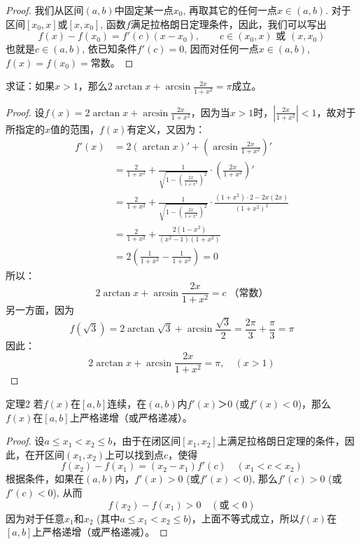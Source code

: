 \begin{proof}
  我们从区间$(a,b)$中固定某一点$x_0$, 再取其它的任何一点$x\in (a,b)$. 对于区间$[x_0,x]$或$[x,x_0]$, 函数$f$满足拉格朗日定理条件，因此，我们可以写出
  \[f (x) -f (x_0) =f' (c) (x-x_0),\qquad c\in (x_0,x)\text{ 或 }(x,x_0)\]
  也就是$c\in (a,b)$, 依已知条件$f'(c)=0$, 因而对任何一点$x\in (a,b)$, $f(x)=f(x_0)=$常数。  
\end{proof}



\begin{example}
    求证：如果$x>1$，那么$2\arctan x+\arcsin\frac{2x}{1+x^2}=\pi$成立。
\end{example}

\begin{proof}
设$f(x)=2\arctan x+\arcsin\frac{2x}{1+x^2}$，因为当$x>1$时，$\left|\frac{2x}{1+x^2}\right|<1$，故对于所指定的$x$值的范围，$f(x)$有定义，又因为：
\[\begin{split}
    f'(x)&=2(\arctan x)'+\left(\arcsin\frac{2x}{1+x^2}\right)'\\
    &=\frac{2}{1+x^2}+\frac{1}{\sqrt{1-\left(\frac{2x}{1+x^2}\right)^2}}\cdot \left(\frac{2x}{1+x^2}\right)'\\
    &=\frac{2}{1+x^2}+\frac{1}{\sqrt{1-\left(\frac{2x}{1+x^2}\right)^2}}\cdot \frac{(1+x^2)\cdot 2-2x(2x)}{(1+x^2)^2}\\
    &=\frac{2}{1+x^2}+\frac{2(1-x^2)}{(x^2-1)(1+x^2)}\\
    &=2\left(\frac{1}{1+x^2}-\frac{1}{1+x^2}\right)=0
\end{split}\]
所以：
\[2\arctan x+\arcsin\frac{2x}{1+x^2}=c\; \text{（常数）}\]
另一方面，因为
\[f\left(\sqrt{3}\right)=2\arctan\sqrt{3}+\arcsin\frac{\sqrt{3}}{2}=\frac{2\pi}{3}+\frac{\pi}{3}=\pi\]
因此：
\[2\arctan x+\arcsin\frac{2x}{1+x^2}=\pi,\quad (x>1)\]
\end{proof}


\begin{blk}
    {定理2} 若$f(x)$在$[a,b]$连续，在$(a,b)$内$f'(x)＞0$ (或$f'(x)<0$)，那么$f(x)$在$[a,b]$上严格递增（或严格递减）。
\end{blk}


\begin{proof}
    设$a\le x_1<x_2\le b$，由于在闭区间$[x_1,x_2]$上满足拉格朗日定理的条件，因此，在开区间$(x_1,x_2)$上可以找到点$c$，使得
\[f(x_2)-f(x_1)=(x_2-x_1)f'(c)\quad (x_1<c<x_2)\]
根据条件，如果在$(a,b)$内，$f'(x)>0$ (或$f'(x)<0$), 那么$f'(c)>0$ (或$f'(c)<0$), 从而
\[f(x_2)-f(x_1)>0\quad (\text{或}<0)\]
因为对于任意$x_1$和$x_2$ (其中$a\le x_1<x_2\le b$)，上面不等式成立，所以$f(x)$在$[a,b]$上严格递增（或严格递减）。
\end{proof}

